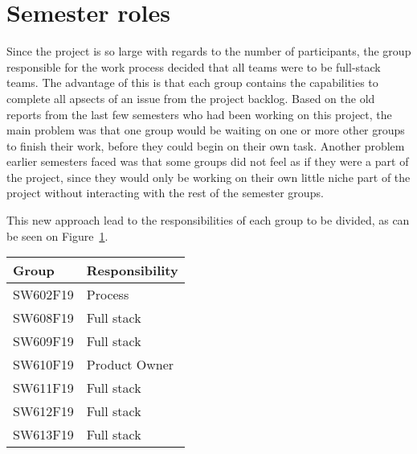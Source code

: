 \section{Semester roles}
Since the project is so large with regards to the number of participants, the group responsible for the work process decided that all teams were to be full-stack teams.
The advantage of this is that each group contains the capabilities to complete all apsects of an issue from the project backlog.
Based on the old reports from the last few semesters who had been working on this project, the main problem was that one group would be waiting on one or more other groups to finish their work, before they could begin on their own task.
Another problem earlier semesters faced was that some groups did not feel as if they were a part of the project, since they would only be working on their own little niche part of the project without interacting with the rest of the semester groups.

This new approach lead to the responsibilities of each group to be divided, as can be seen on Figure~\ref{TBL:GroupResponsibility}.
\begin{table}[H]
\centering
\begin{tabular}{|l|l|}
\hline
\textbf{Group} & \textbf{Responsibility} \\ \hline
SW602F19       & Process                 \\ \hline
SW608F19       & Full stack              \\ \hline
SW609F19       & Full stack              \\ \hline
SW610F19       & Product Owner           \\ \hline
SW611F19       & Full stack              \\ \hline
SW612F19       & Full stack              \\ \hline
SW613F19       & Full stack              \\ \hline
\end{tabular}
\label{TBL:GroupResponsibility}
\end{table}
